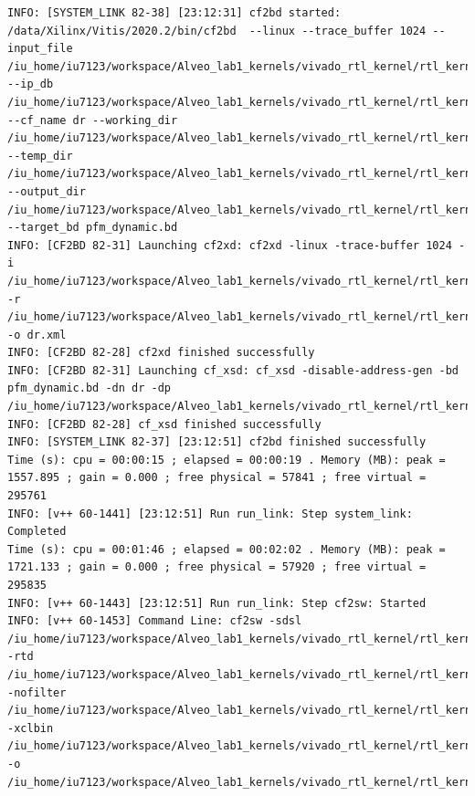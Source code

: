 \begin{lstlisting}
INFO: [SYSTEM_LINK 82-38] [23:12:31] cf2bd started: /data/Xilinx/Vitis/2020.2/bin/cf2bd  --linux --trace_buffer 1024 --input_file /iu_home/iu7123/workspace/Alveo_lab1_kernels/vivado_rtl_kernel/rtl_kernel_wizard_2_ex/exports/_x/link/sys_link/cfgraph/cfgen_cfgraph.xml --ip_db /iu_home/iu7123/workspace/Alveo_lab1_kernels/vivado_rtl_kernel/rtl_kernel_wizard_2_ex/exports/_x/link/sys_link/_sysl/.cdb/xd_ip_db.xml --cf_name dr --working_dir /iu_home/iu7123/workspace/Alveo_lab1_kernels/vivado_rtl_kernel/rtl_kernel_wizard_2_ex/exports/_x/link/sys_link/_sysl/.xsd --temp_dir /iu_home/iu7123/workspace/Alveo_lab1_kernels/vivado_rtl_kernel/rtl_kernel_wizard_2_ex/exports/_x/link/sys_link --output_dir /iu_home/iu7123/workspace/Alveo_lab1_kernels/vivado_rtl_kernel/rtl_kernel_wizard_2_ex/exports/_x/link/int --target_bd pfm_dynamic.bd
INFO: [CF2BD 82-31] Launching cf2xd: cf2xd -linux -trace-buffer 1024 -i /iu_home/iu7123/workspace/Alveo_lab1_kernels/vivado_rtl_kernel/rtl_kernel_wizard_2_ex/exports/_x/link/sys_link/cfgraph/cfgen_cfgraph.xml -r /iu_home/iu7123/workspace/Alveo_lab1_kernels/vivado_rtl_kernel/rtl_kernel_wizard_2_ex/exports/_x/link/sys_link/_sysl/.cdb/xd_ip_db.xml -o dr.xml
INFO: [CF2BD 82-28] cf2xd finished successfully
INFO: [CF2BD 82-31] Launching cf_xsd: cf_xsd -disable-address-gen -bd pfm_dynamic.bd -dn dr -dp /iu_home/iu7123/workspace/Alveo_lab1_kernels/vivado_rtl_kernel/rtl_kernel_wizard_2_ex/exports/_x/link/sys_link/_sysl/.xsd
INFO: [CF2BD 82-28] cf_xsd finished successfully
INFO: [SYSTEM_LINK 82-37] [23:12:51] cf2bd finished successfully
Time (s): cpu = 00:00:15 ; elapsed = 00:00:19 . Memory (MB): peak = 1557.895 ; gain = 0.000 ; free physical = 57841 ; free virtual = 295761
INFO: [v++ 60-1441] [23:12:51] Run run_link: Step system_link: Completed
Time (s): cpu = 00:01:46 ; elapsed = 00:02:02 . Memory (MB): peak = 1721.133 ; gain = 0.000 ; free physical = 57920 ; free virtual = 295835
INFO: [v++ 60-1443] [23:12:51] Run run_link: Step cf2sw: Started
INFO: [v++ 60-1453] Command Line: cf2sw -sdsl /iu_home/iu7123/workspace/Alveo_lab1_kernels/vivado_rtl_kernel/rtl_kernel_wizard_2_ex/exports/_x/link/int/sdsl.dat -rtd /iu_home/iu7123/workspace/Alveo_lab1_kernels/vivado_rtl_kernel/rtl_kernel_wizard_2_ex/exports/_x/link/int/cf2sw.rtd -nofilter /iu_home/iu7123/workspace/Alveo_lab1_kernels/vivado_rtl_kernel/rtl_kernel_wizard_2_ex/exports/_x/link/int/cf2sw_full.rtd -xclbin /iu_home/iu7123/workspace/Alveo_lab1_kernels/vivado_rtl_kernel/rtl_kernel_wizard_2_ex/exports/_x/link/int/xclbin_orig.xml -o /iu_home/iu7123/workspace/Alveo_lab1_kernels/vivado_rtl_kernel/rtl_kernel_wizard_2_ex/exports/_x/link/int/xclbin_orig.1.xml

\end{lstlisting}
